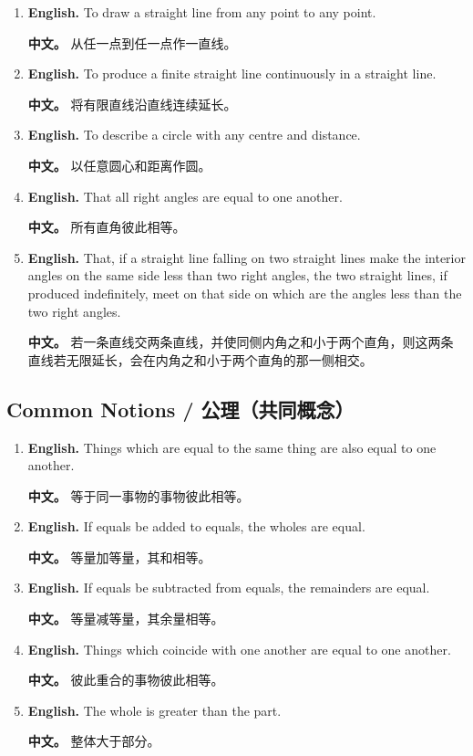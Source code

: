 \begin{enumerate}
\item \textbf{English.} To draw a straight line from any point to any point. \par\textbf{中文。} 从任一点到任一点作一直线。
\item \textbf{English.} To produce a finite straight line continuously in a straight line. \par\textbf{中文。} 将有限直线沿直线连续延长。
\item \textbf{English.} To describe a circle with any centre and distance. \par\textbf{中文。} 以任意圆心和距离作圆。
\item \textbf{English.} That all right angles are equal to one another. \par\textbf{中文。} 所有直角彼此相等。
\item \textbf{English.} That, if a straight line falling on two straight lines make the interior angles on the same side less than two right angles, the two straight lines, if produced indefinitely, meet on that side on which are the angles less than the two right angles. \par\textbf{中文。} 若一条直线交两条直线，并使同侧内角之和小于两个直角，则这两条直线若无限延长，会在内角之和小于两个直角的那一侧相交。
\end{enumerate}

\subsection*{Common Notions / 公理（共同概念）}

\begin{enumerate}
\item \textbf{English.} Things which are equal to the same thing are also equal to one another. \par\textbf{中文。} 等于同一事物的事物彼此相等。
\item \textbf{English.} If equals be added to equals, the wholes are equal. \par\textbf{中文。} 等量加等量，其和相等。
\item \textbf{English.} If equals be subtracted from equals, the remainders are equal. \par\textbf{中文。} 等量减等量，其余量相等。
\item \textbf{English.} Things which coincide with one another are equal to one another. \par\textbf{中文。} 彼此重合的事物彼此相等。
\item \textbf{English.} The whole is greater than the part. \par\textbf{中文。} 整体大于部分。
\end{enumerate}

